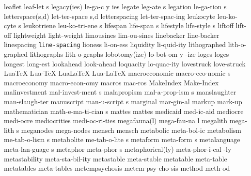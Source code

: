 \5 leaflet		leaf-let s		%
\NewWordtrue
\3 legacy(ies)		le-ga-c y ies		%
\NewWordtrue
\5 legate		leg-ate s		%
\NewWordtrue
\5 legation		le-ga-tion s		%
\2 letterspace(s,d)	let-ter-space s,d	%
\1 letterspacing	let-ter-spac-ing
\5 leukocyte	 	leu-ko-cyte s 		%
\5 leukotriene		leu-ko-tri-ene s	%
\5 lifespan		life-span s
\5 lifestyle		life-style s            %
\1 liftoff		lift-off		%
\1 lightweight		light-weight
\1 limousines		lim-ou-sines
\1 linebacker		line-backer
\1 linespacing		{\tt\bs line-spacing}
\1 lioness		li-on-ess		%
\1 liquidity		li-quid-ity		%
\1 lithographed		lith-o-graphed
\1 lithographs		lith-o-graphs
\3 lobotomy(ize)	lo-bot-om y -ize
\1 loges		loges
\1 longest		long-est
\1 lookahead		look-ahead		%
\1 loquacity		lo-quac-ity          %
\1 lovestruck           love-struck		%
\NewWordtrue
\1 LuaTeX		Lua-TeX			%
\NewWordtrue
\1 LuaLaTeX		Lua-LaTeX		%
\5 macroeconomic	macro-eco-nomic s
\1 macroeconomy		macro-econ-omy		%
\NewWordtrue
\1 macros		mac-ros			%
\1 MakeIndex		Make-Index		%
\NewWordtrue
\5 malinvestment	mal-invest-ment s	%
\5 malapropism		mal-a-prop-ism s
\1 manslaughter		man-slaugh-ter		%
\5 manuscript		man-u-script s
\1 marginal		mar-gin-al
\NewWordtrue
\1 markup		mark-up			%
\5 mathematician	math-e-ma-ti-cian s
\1 mattes		mattes
\1 medicaid		med-ic-aid
\1 mediocre		medi-ocre
\1 mediocrities		medi-oc-ri-ties
\2 megafauna(l)		mega-fau-na l		%
\5 megalith		mega-lith s
\1 meganodes		mega-nodes		%
\NewWordtrue
\1 mensch		mensch			%
\1 metabolic		meta-bol-ic
\5 metabolism		me-tab-o-lism s
\5 metabolite		me-tab-o-lite s
\5 metaform		meta-form s		%
\5 metalanguage		meta-lan-guage s
\5 metaphor		meta-phor s		%
\2 metaphorical(ly)	meta-phor-i-cal -ly	%
\1 metastability	meta-sta-bil-ity	%
\1 metastable		meta-stable		%
\1 metatable		meta-table		%
\1 metatables		meta-tables		%
\1 metempsychosis	metem-psy-cho-sis	%
\1 method		meth-od			%
